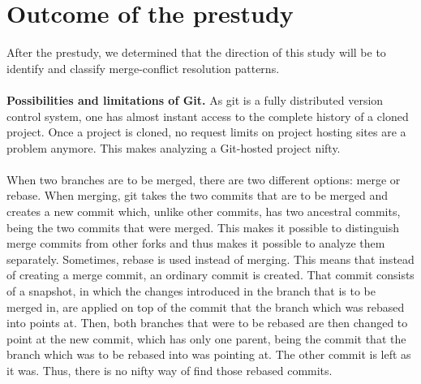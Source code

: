 \section{Outcome of the prestudy}
After the prestudy, we determined that the direction of this study will be to identify and classify merge-conflict resolution patterns.
\paragraph*{}
\textbf{Possibilities and limitations of Git.} As git is a fully distributed version control system, one has almost instant access to the complete history of a cloned project. Once a project is cloned, no request limits on project hosting sites are a problem anymore. This makes analyzing a Git-hosted project nifty.
\paragraph*{}
When two branches are to be merged, there are two different options: merge or rebase. When merging, git takes the two commits that are to be merged and creates a new commit which, unlike other commits, has two ancestral commits, being the two commits that were merged. This makes it possible to distinguish merge commits from other forks and thus makes it possible to analyze them separately. Sometimes, rebase is used instead of merging. This means that instead of creating a merge commit, an ordinary commit is created. That commit consists of a snapshot, in which the changes introduced in the branch that is to be merged in, are applied on top of the commit that the branch which was rebased into points at. Then, both branches that were to be rebased are then changed to point at the new commit, which has only one parent, being the commit that the branch which was to be rebased into was pointing at. The other commit is left as it was. Thus, there is no nifty way of find those rebased commits.

